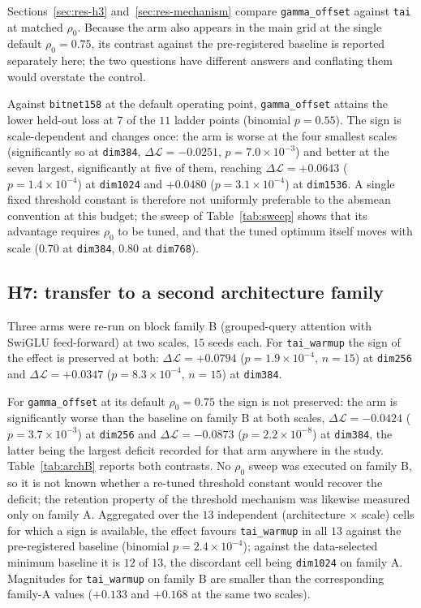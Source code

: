 \documentclass[final,5p,times,twocolumn]{elsarticle}
\theoremstyle{remark}
\newcommand{\rhoz}{\rho_{0}}
\newcommand{\dL}{\Delta\mathcal{L}}
\begin{document}
Sections~\ref{sec:res-h3} and~\ref{sec:res-mechanism} compare
\texttt{gamma\_offset} against \texttt{tai} at matched $\rhoz$. Because
the arm also appears in the main grid at the single default $\rhoz = 0.75$, its
contrast against the pre-registered baseline is reported separately here; the
two questions have different answers and conflating them would overstate the
control.

Against \texttt{bitnet158} at the default operating point,
\texttt{gamma\_offset} attains the lower held-out loss at $7$ of the $11$
ladder points (binomial $p = 0.55$). The sign is scale-dependent and changes
once: the arm is worse at the four smallest scales (significantly so at
\texttt{dim384}, $\dL = -0.0251$, $p = 7.0\times 10^{-3}$) and better at the
seven largest, significantly at five of them, reaching $\dL = +0.0643$
($p = 1.4\times 10^{-4}$) at \texttt{dim1024} and $+0.0480$
($p = 3.1\times 10^{-4}$) at \texttt{dim1536}. A single fixed threshold
constant is therefore not uniformly preferable to the absmean convention at
this budget; the sweep of Table~\ref{tab:sweep} shows that its advantage
requires $\rhoz$ to be tuned, and that the tuned optimum itself moves with
scale ($0.70$ at \texttt{dim384}, $0.80$ at \texttt{dim768}).

\subsection{H7: transfer to a second architecture family}
\label{sec:res-h7}

Three arms were re-run on block family B (grouped-query attention with SwiGLU
feed-forward) at two scales, $15$ seeds each. For \texttt{tai\_warmup} the sign
of the effect is preserved at both: $\dL = +0.0794$
($p = 1.9\times 10^{-4}$, $n = 15$) at \texttt{dim256} and $\dL = +0.0347$
($p = 8.3\times 10^{-4}$, $n = 15$) at \texttt{dim384}.

For \texttt{gamma\_offset} at its default $\rhoz = 0.75$ the sign is
not preserved: the arm is significantly worse than the baseline on
family B at both scales, $\dL = -0.0424$ ($p = 3.7\times 10^{-3}$) at
\texttt{dim256} and $\dL = -0.0873$ ($p = 2.2\times 10^{-8}$) at
\texttt{dim384}, the latter being the largest deficit recorded for that arm
anywhere in the study. Table~\ref{tab:archB} reports both contrasts. No
$\rhoz$ sweep was executed on family B, so it is not known whether a
re-tuned threshold constant would recover the deficit; the retention property
of the threshold mechanism was likewise measured only on family A. Aggregated
over the $13$ independent (architecture $\times$ scale) cells for which a sign
is available, the effect favours \texttt{tai\_warmup} in all $13$ against the
pre-registered baseline (binomial $p = 2.4\times 10^{-4}$); against the
data-selected minimum baseline it is $12$ of $13$, the discordant cell being
\texttt{dim1024} on family A.
Magnitudes for \texttt{tai\_warmup} on family B are smaller than the
corresponding family-A values ($+0.133$ and $+0.168$ at the same two
scales).
\end{document}
